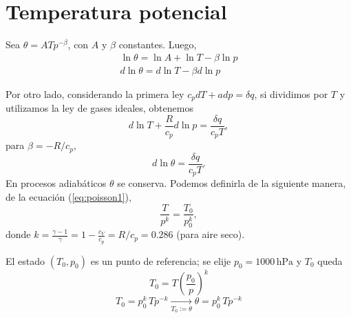 \documentclass[openany]{book}
\begin{document}
\section{Temperatura potencial}
Sea $\theta=ATp^{-\beta}$, con $A$ y $\beta$ constantes. Luego,
\begin{gather*}
	\ln{\theta}=\ln{A}+\ln{T}-\beta\ln{p}\\
	d\ln{\theta}=d\ln{T}-\beta d\ln{p}
\end{gather*}
\par Por otro lado, considerando la primera ley $c_pdT+adp=\delta q$, si dividimos por $T$ y utilizamos la ley de gases ideales, obtenemos
\begin{equation*}
	d\ln{T}+\frac{R}{c_p}d\ln{p}=\frac{\delta q}{c_pT},
\end{equation*}
para $\beta=-R/c_p$,
\begin{equation}\label{eq:thetaq}
	d\ln{\theta}=\frac{\delta q}{c_pT}.
\end{equation}
En procesos adiabáticos $\theta$ se conserva. Podemos definirla de la siguiente manera, de la ecuación (\ref{eq:poisson1}),
\begin{equation*}
	\frac{T}{p^k}=\frac{T_0}{p_0^k},
\end{equation*}
donde $k={\frac{\gamma-1}{\gamma}}=1-\frac{c_V}{c_p}=R/c_p=0.286$ (para aire seco).
\par El estado $(T_0,p_0)$ es un punto de referencia; se elije $p_0=1000\,\mathrm{hPa}$ y $T_0$ queda
\begin{equation*}
	T_0=T\left(\frac{p_0}{p}\right)^k
\end{equation*}
\begin{equation}\label{eq:theta}
	T_0=p_0^k\,Tp^{-k}\xrightarrow[T_0:=\theta]{}\boxed{\theta=p_0^k\,Tp^{-k}}
\end{equation}
\end{document}
